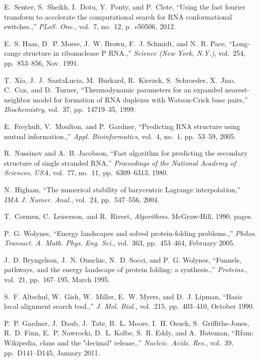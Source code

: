 \documentclass[11pt, oneside]{Thesis} %
\begin{document}
\begin{thebibliography}{100}
E.~Senter, S.~Sheikh, I.~Dotu, Y.~Ponty, and P.~Clote, ``Using the fast fourier
  transform to accelerate the computational search for {RNA} conformational
  switches.,'' {\em PLoS. One.}, vol.~7, no.~12, p.~e50506, 2012.

E.~S. Haas, D.~P. Morse, J.~W. Brown, F.~J. Schmidt, and N.~R. Pace,
  ``{Long-range structure in ribonuclease P RNA.},'' {\em Science (New York,
  N.Y.)}, vol.~254, pp.~853--856, Nov. 1991.

T.~Xia, J.~J.~SantaLucia, M.~Burkard, R.~Kierzek, S.~Schroeder, X.~Jiao,
  C.~Cox, and D.~Turner, ``Thermodynamic parameters for an expanded
  nearest-neighbor model for formation of {RNA} duplexes with {W}atson-{C}rick
  base pairs,'' {\em Biochemistry}, vol.~37, pp.~14719--35, 1999.

E.~Freyhult, V.~Moulton, and P.~Gardner, ``Predicting {RNA} structure using
  mutual information.,'' {\em Appl. Bioinformatics}, vol.~4, no.~1, pp.~53--59,
  2005.

R.~Nussinov and A.~B. Jacobson, ``Fast algorithm for predicting the secondary
  structure of single stranded {RNA},'' {\em Proceedings of the National
  Academy of Sciences, USA}, vol.~77, no.~11, pp.~6309--6313, 1980.

N.~Higham, ``The numerical stability of barycentric {L}agrange interpolation,''
  {\em IMA J. Numer. Anal.}, vol.~24, pp.~547--556, 2004.

T.~Cormen, C.~Leiserson, and R.~Rivest, {\em Algorithms}.
\newblock McGraw-Hill, 1990.
 pages.

P.~G. Wolynes, ``Energy landscapes and solved protein-folding problems.,'' {\em
  Philos. Transact. A. Math. Phys. Eng. Sci.}, vol.~363, pp.~453--464, February
  2005.

J.~D. Bryngelson, J.~N. Onuchic, N.~D. Socci, and P.~G. Wolynes, ``Funnels,
  pathways, and the energy landscape of protein folding: a synthesis.,'' {\em
  Proteins.}, vol.~21, pp.~167--195, March 1995.

S.~F. Altschul, W.~Gish, W.~Miller, E.~W. Myers, and D.~J. Lipman, ``Basic
  local alignment search tool.,'' {\em J. Mol. Biol.}, vol.~215, pp.~403--410,
  October 1990.

P.~P. Gardner, J.~Daub, J.~Tate, B.~L. Moore, I.~H. Osuch, S.~Griffiths-Jones,
  R.~D. Finn, E.~P. Nawrocki, D.~L. Kolbe, S.~R. Eddy, and A.~Bateman, ``Rfam:
  {Wikipedia}, clans and the "decimal" release.,'' {\em Nucleic. Acids. Res.},
  vol.~39, pp.~D141--D145, January 2011.


\end{thebibliography}
\end{document}
